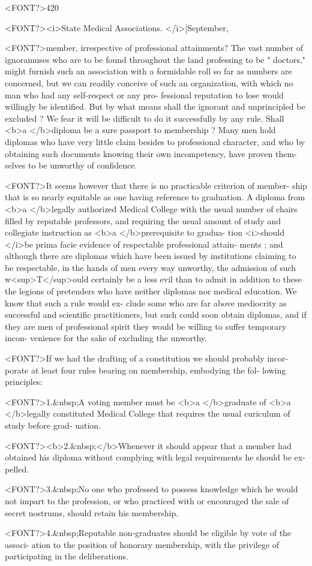 <FONT?>420

<FONT?><i>State Medical Associations. </i>[September,

<FONT?>member, irrespective of professional attainments? The vast number
of ignoramuses who are to be found throughout the land professing to
be " doctors," might furnish such an association with a formidable roll
so far as numbers are concerned, but we can readily conceive of such
an organization, with which no man who had any self-respect or any pro-
fessional reputation to lose would willingly be identified. But by what
means shall the ignorant and unprincipled be excluded ? We fear it
will be difficult to do it successfully by any rule. Shall <b>a </b>diploma be
a sure passport to membership ? Many men hold diplomas who have
very little claim besides to professional character, and who by obtaining
such documents knowing their own incompetency, have proven them-
selves to be unworthy of confidence.

<FONT?>It seems however that there is no practicable criterion of member-
ship that is so nearly equitable as one having reference to graduation.
A diploma from <b>a </b>legally authorized Medical College with the usual
number of chairs filled by reputable professors, and requiring the usual
amount of study and collegiate instruction as <b>a </b>prerequisite to gradua-
tion <i>should </i>be prima facie evidence of respectable professional attain-
ments ; and although there are diplomas which have been issued by
institutions claiming to be respectable, in the hands of men every way
unworthy, the admission of such w<sup>T</sup>ould certainly be a less evil than to
admit in addition to these the legions of pretenders who have neither
diplomas nor medical education. We know that such a rule would ex-
clude some who are far above mediocrity as successful and scientific
practitioners, but such could soon obtain diplomas, and if they are men
of professional spirit they would be willing to suffer temporary incon-
venience for the sake of excluding the unworthy.

<FONT?>If we had the drafting of a constitution we should probably incor-
porate at least four rules bearing on membership, embodying the fol-
lowing principles:

<FONT?>1.&nbsp;A voting member must be <b>a </b>graduate of <b>a </b>legally constituted
Medical College that requires the usual curiculum of study before grad-
uation.

<FONT?><b>2.&nbsp;</b>Whenever it should appear that a member had obtained his
diploma without complying with legal requirements he should be ex-
pelled.

<FONT?>3.&nbsp;No one who professed to possess knowledge which he would not
impart to the profession, or who practiced with or encouraged the sale of
secret nostrums, should retain his membership.

<FONT?>4.&nbsp;Reputable non-graduates should be eligible by vote of the associ-
ation to the position of honorary membership, with the privilege of
participating in the deliberations.\endinput
